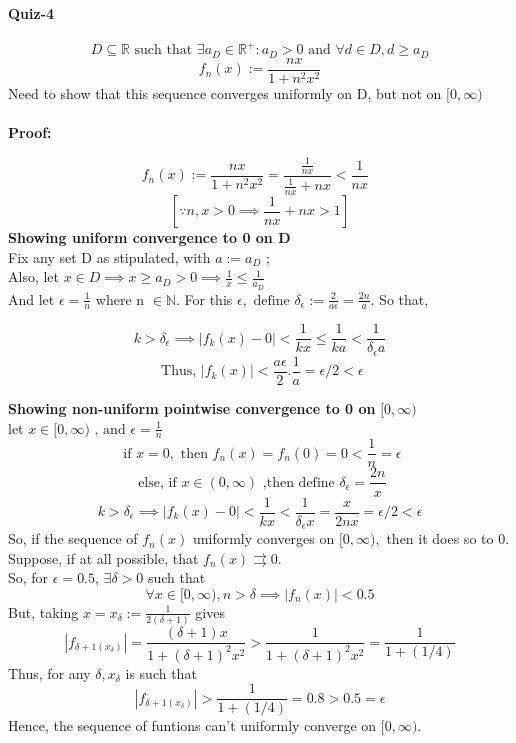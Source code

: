 \documentclass[20pt]{extarticle} %
\begin{document}
\paragraph{Quiz-4}

\[D \subseteq \mathbb{R} \text{ such that } \exists a_D \in \mathbb{R^+}: a_D >0 \text{ and }  \forall d \in D, d \geq a_D    \]
\[  f_n(x):= \frac{nx}{1+n^2x^2}   \]
Need to show that this sequence converges uniformly on D, but not on $[0,\infty)$\\\\
\textbf{Proof:}

	\[  f_n(x):= \frac{nx}{1+n^2x^2}= \frac {\frac{1}{nx}}{ \frac{1}{nx}+nx}< \frac{1}{nx} \text{   } \]
	\[ [    \because n,x>0 \implies \frac{1}{nx}+nx>1 ] \]
\textbf{Showing uniform convergence to 0 on D}\\
	Fix any set D as stipulated, with $a:=a_D$ ;
	\\Also, let $x \in D \implies x \geq a_D >0 \implies \frac{1}{x} \leq \frac{1}{a_D}  $ \\
	And let $\epsilon = \frac{1}{n}$ where n $\in \mathbb{N}$.
	For this $\epsilon, \text{ define }  \delta_\epsilon:= \frac{2}{a\epsilon} = \frac{2n}{a} $. So that,

	\[ k> \delta_\epsilon \implies |f_k(x)-0|< \frac{1}{kx} \leq \frac{1}{ka}  < \frac{1}{\delta_\epsilon a}\]
	\[ \text{ Thus, } |f_k(x)|< \frac{a\epsilon}{2} . \frac{1}{a}=\epsilon/2<\epsilon \]
\newpage

\textbf{Showing non-uniform pointwise convergence to 0 on }$[0,\infty)$\\
let $x\in[ 0,\infty) \text{ , and } \epsilon= \frac{1}{n}$ \\
	\[ \text{ if } x=0, \text{ then } f_n(x)=f_n(0)=0< \frac{1}{n}=\epsilon  \]
\[\text{ else, if }x \in (0,\infty) \text{ ,then define }\delta_\epsilon= \frac{2n}{x} \]
\[ k> \delta_\epsilon \implies |f_k(x)-0|< \frac{1}{kx}  < \frac{1}{\delta_\epsilon x}= \frac{x}{2nx}=\epsilon/2< \epsilon \]
So, if the sequence of $f_n(x)$ uniformly converges on $[0,\infty),$ then it does so to 0. Suppose, if at all possible, that $f_n(x) \rightrightarrows 0$.\\
So, for $\epsilon=0.5$, $\exists \delta>0$ such that
\[ \forall x \in[0,\infty), n>\delta \implies |f_n(x)|< 0.5\]
But, taking $x = x_\delta := \frac{1}{2(\delta+1)} $ gives
\[|f_{\delta+1(x_\delta)}|= \frac{(\delta+1)x}{1+(\delta +1)^2x^2}> \frac{1}{1+(\delta +1)^2x^2}= \frac{1}{1+(1/4)}\]
Thus, for any $\delta, x_\delta$ is such that
\[ |f_{\delta+1(x_\delta)}| > \frac{1}{1+(1/4)}= 0.8>0.5=\epsilon \]
Hence, the sequence of funtions can't uniformly converge on $[0,\infty)$.
\end{document}
